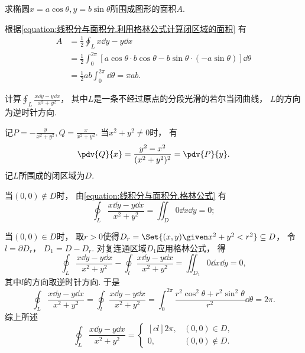 \begin{example}
求椭圆\(x = a \cos\theta, y = b \sin\theta\)所围成图形的面积\(A\).
\begin{solution}
根据\cref{equation:线积分与面积分.利用格林公式计算闭区域的面积} 有
\begin{align*}
	A &= \frac{1}{2} \oint_L x\dd{y}-y\dd{x} \\
	&= \frac{1}{2} \int_0^{2\pi}
		\left[
			a \cos\theta \cdot b \cos\theta
			- b \sin\theta \cdot (-a \sin\theta)
		\right] \dd{\theta} \\
	&= \frac{1}{2} ab \int_0^{2\pi} \dd{\theta}
	= \pi ab.
\end{align*}
\end{solution}
\end{example}

\begin{example}
计算\(\oint_L \frac{x\dd{y}-y\dd{x}}{x^2+y^2}\)，
其中\(L\)是一条不经过原点的分段光滑的若尔当闭曲线，
\(L\)的方向为逆时针方向.
\begin{solution}
记\(P = -\frac{y}{x^2+y^2}, Q = \frac{x}{x^2+y^2}\).
当\(x^2+y^2\neq0\)时，
有\begin{equation*}
	\pdv{Q}{x} = \frac{y^2-x^2}{(x^2+y^2)^2} = \pdv{P}{y}.
\end{equation*}
记\(L\)所围成的闭区域为\(D\).

当\((0,0) \notin D\)时，
由\cref{equation:线积分与面积分.格林公式} 有\begin{equation*}
	\oint_L \frac{x\dd{y}-y\dd{x}}{x^2+y^2} = \iint_D 0 \dd{x}\dd{y} = 0;
\end{equation*}

当\((0,0) \in D\)时，
取\(r>0\)使得\(D_r = \Set{ (x,y) \given x^2+y^2 < r^2 } \subseteq D\)，
令\(l = \partial D_r\)，
\(D_1 = D - D_r\).
对复连通区域\(D_1\)应用格林公式，
得\begin{equation*}
	\oint_L \frac{x\dd{y}-y\dd{x}}{x^2+y^2} - \oint_l \frac{x\dd{y}-y\dd{x}}{x^2+y^2}
	= \iint_{D_1} 0 \dd{x}\dd{y} = 0,
\end{equation*}
其中\(l\)的方向取逆时针方向.
于是\begin{equation*}
	\oint_L \frac{x\dd{y}-y\dd{x}}{x^2+y^2}
	= \oint_l \frac{x\dd{y}-y\dd{x}}{x^2+y^2}
	= \int_0^{2\pi} \frac{r^2 \cos^2\theta + r^2 \sin^2\theta}{r^2} \dd{\theta}
	= 2\pi.
\end{equation*}
综上所述\begin{equation*}
	\oint_L \frac{x\dd{y}-y\dd{x}}{x^2+y^2}
	= \begin{cases}[cl]
		2\pi, & (0,0) \in D, \\
		0, & (0,0) \notin D.
	\end{cases}
\end{equation*}
\end{solution}
\end{example}

